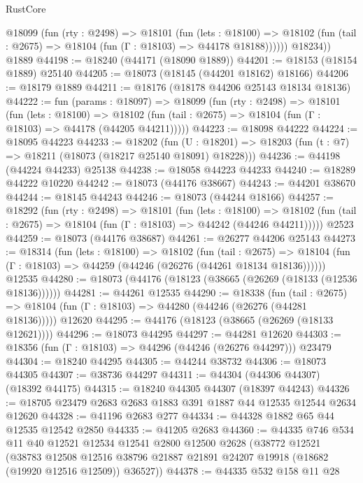 \begin{lexlean}{RustCore}
\begin{coremodule}
          @18099
            (fun (rty : @2498) =>
            @18101
              (fun (lets : @18100) =>
              @18102 (fun (tail : @2675) => @18104 (fun (Γ : @18103) => @44178 @18188))))))
        @18234))
    @1889
@44198 := @18240 (@44171 (@18090 @1889))
@44201 := @18153 (@18154 @1889) @25140
@44205 := @18073 (@18145 (@44201 @18162) @18166)
@44206 := @18179 @1889
@44211 := @18176 (@18178 @44206 @25143 @18134 @18136)
@44222 := fun (params : @18097) =>
  @18099
    (fun (rty : @2498) =>
    @18101
      (fun (lets : @18100) =>
      @18102 (fun (tail : @2675) => @18104 (fun (Γ : @18103) => @44178 (@44205 @44211)))))
@44223 := @18098 @44222
@44224 := @18095 @44223
@44233 := @18202
    (fun (U : @18201) => @18203 (fun (t : @7) => @18211 (@18073 (@18217 @25140 @18091) @18228)))
@44236 := @44198 (@44224 @44233) @25138
@44238 := @18058 @44223 @44233
@44240 := @18289 @44222 @10220
@44242 := @18073 (@44176 @38667)
@44243 := @44201 @38670
@44244 := @18145 @44243
@44246 := @18073 (@44244 @18166)
@44257 := @18292
    (fun (rty : @2498) =>
    @18101
      (fun (lets : @18100) =>
      @18102 (fun (tail : @2675) => @18104 (fun (Γ : @18103) => @44242 (@44246 @44211)))))
    @2523
@44259 := @18073 (@44176 @38687)
@44261 := @26277 @44206 @25143
@44273 := @18314
    (fun (lets : @18100) =>
    @18102
      (fun (tail : @2675) =>
      @18104 (fun (Γ : @18103) => @44259 (@44246 (@26276 (@44261 @18134 @18136))))))
    @12535
@44280 := @18073 (@44176 (@18123 (@38665 (@26269 (@18133 (@12536 @18136))))))
@44281 := @44261 @12535
@44290 := @18338
    (fun (tail : @2675) => @18104 (fun (Γ : @18103) => @44280 (@44246 (@26276 (@44281 @18136)))))
    @12620
@44295 := @44176 (@18123 (@38665 (@26269 (@18133 @12621))))
@44296 := @18073 @44295
@44297 := @44281 @12620
@44303 := @18356 (fun (Γ : @18103) => @44296 (@44246 (@26276 @44297))) @23479
@44304 := @18240 @44295
@44305 := @44244 @38732
@44306 := @18073 @44305
@44307 := @38736 @44297
@44311 := @44304 (@44306 @44307) (@18392 @44175)
@44315 := @18240 @44305 @44307 (@18397 @44243)
@44326 := @18705 @23479 @2683 @2683 @1883 @391 @1887 @44 @12535 @12544 @2634 @12620
@44328 := @41196 @2683 @277
@44334 := @44328 @1882 @65 @44 @12535 @12542 @2850
@44335 := @41205 @2683
@44360 := @44335
    @746
    @534
    @11
    @40
    @12521
    @12534
    @12541
    @2800
    @12500
    @2628
    (@38772
      @12521
      (@38783
        @12508
        @12516
        @38796
        @21887
        @21891
        @24207
        @19918
        (@18682 (@19920 @12516 @12509))
        @36527))
@44378 := @44335
    @532
    @158
    @11
    @28

\end{coremodule}
\end{lexlean}
